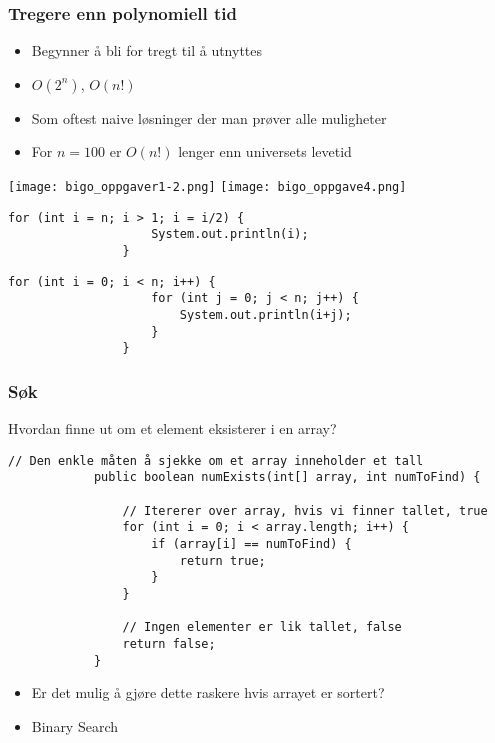 \documentclass[norsk, handout]{beamer}
\begin{document}
    \begin{frame}
        \frametitle{Tregere enn polynomiell tid}

        \begin{itemize}
            \item Begynner å bli for tregt til å utnyttes
            \item $O(2^{n})$, $O(n!)$
            \item Som oftest naive løsninger der man prøver alle muligheter
            \item For $n = 100$ er $O(n!)$ lenger enn universets levetid
        \end{itemize}
    \end{frame}

    \begin{frame}[fragile]
        \begin{center}
            \texttt{[image: bigo\_oppgaver1-2.png]}
            \texttt{[image: bigo\_oppgave4.png]}

        \begin{lstlisting}[basicstyle=\scriptsize]
                for (int i = n; i > 1; i = i/2) {
                    System.out.println(i);
                }
		\end{lstlisting}
        \end{center}

        \begin{center}
        \begin{lstlisting}[basicstyle=\scriptsize]
                for (int i = 0; i < n; i++) {
                    for (int j = 0; j < n; j++) {
                        System.out.println(i+j);
                    }
                }
		\end{lstlisting}
        \end{center}
    \end{frame}

    \begin{frame}[fragile]
        \frametitle{Søk}
        Hvordan finne ut om et element eksisterer i en array?
        \pause
        \begin{lstlisting}[basicstyle=\scriptsize]
            // Den enkle måten å sjekke om et array inneholder et tall
            public boolean numExists(int[] array, int numToFind) {

                // Itererer over array, hvis vi finner tallet, true
                for (int i = 0; i < array.length; i++) {
                    if (array[i] == numToFind) {
                        return true;
                    }
                }

                // Ingen elementer er lik tallet, false
                return false;
            }
		\end{lstlisting}

        \begin{itemize}
            \item Er det mulig å gjøre dette raskere hvis arrayet er sortert?
            \pause
        \item Binary Search {\Emoji🤯}
        \end{itemize}
    \end{frame}
\end{document}
